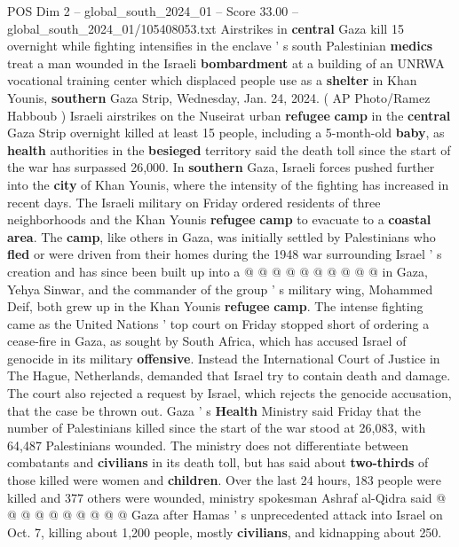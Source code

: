 \begin{textsample}{POS Dim 2 – global\_south\_2024\_01 – Score 33.00 – global\_south\_2024\_01/105408053.txt}  \label{ex:f2_pos_123}
Airstrikes in \textbf{central} Gaza kill 15 overnight while fighting intensifies in the enclave ' s south Palestinian \textbf{medics} treat a man wounded in the Israeli \textbf{bombardment} at a building of an UNRWA vocational training center which displaced people use as a \textbf{shelter} in Khan Younis, \textbf{southern} Gaza Strip, Wednesday, Jan. 24, 2024. ( AP Photo/Ramez Habboub ) Israeli airstrikes on the Nuseirat urban \textbf{refugee} \textbf{camp} in the \textbf{central} Gaza Strip overnight killed at least 15 people, including a 5-month-old \textbf{baby}, as \textbf{health} authorities in the \textbf{besieged} territory said the death toll since the start of the war has surpassed 26,000.
In \textbf{southern} Gaza, Israeli forces pushed further into the \textbf{city} of Khan Younis, where the intensity of the fighting has increased in recent days.
The Israeli military on Friday ordered residents of three neighborhoods and the Khan Younis \textbf{refugee} \textbf{camp} to evacuate to a \textbf{coastal} \textbf{area}.
The \textbf{camp}, like others in Gaza, was initially settled by Palestinians who \textbf{fled} or were driven from their homes during the 1948 war surrounding Israel ' s creation and has since been built up into a @ @ @ @ @ @ @ @ @ @ in Gaza, Yehya Sinwar, and the commander of the group ' s military wing, Mohammed Deif, both grew up in the Khan Younis \textbf{refugee} \textbf{camp}.
The intense fighting came as the United Nations ' top court on Friday stopped short of ordering a cease-fire in Gaza, as sought by South Africa, which has accused Israel of genocide in its military \textbf{offensive}.
Instead the International Court of Justice in The Hague, Netherlands, demanded that Israel try to contain death and damage.
The court also rejected a request by Israel, which rejects the genocide accusation, that the case be thrown out.
Gaza ' s \textbf{Health} Ministry said Friday that the number of Palestinians killed since the start of the war stood at 26,083, with 64,487 Palestinians wounded.
The ministry does not differentiate between combatants and \textbf{civilians} in its death toll, but has said about \textbf{two-thirds} of those killed were women and \textbf{children}.
Over the last 24 hours, 183 people were killed and 377 others were wounded, ministry spokesman Ashraf al-Qidra said @ @ @ @ @ @ @ @ @ @ Gaza after Hamas ' s unprecedented attack into Israel on Oct. 7, killing about 1,200 people, mostly \textbf{civilians}, and kidnapping about 250.

\end{textsample}
